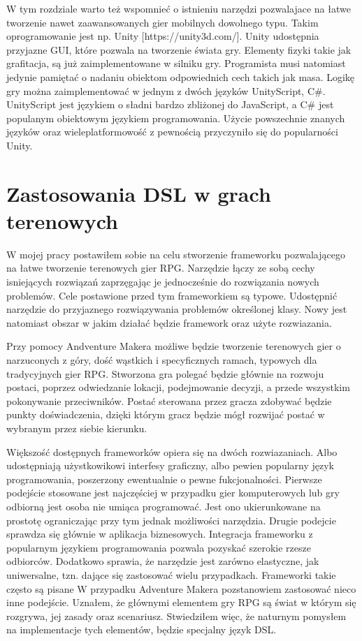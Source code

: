 \documentclass	{xmgr}
\begin{document}
W tym rozdziale warto też wspomnieć o istnieniu narzędzi pozwalajace na łatwe tworzenie nawet zaawansowanych gier mobilnych dowolnego typu. Takim oprogramowanie jest np. Unity [https://unity3d.com/]. Unity udostępnia przyjazne GUI, które pozwala na tworzenie świata gry. Elementy fizyki takie jak grafitacja, są już zaimplementowane w silniku gry. Programista musi natomiast jedynie pamiętać o nadaniu obiektom odpowiednich cech takich jak masa. Logikę gry można zaimplementować w jednym z dwóch języków UnityScript, C\#. UnityScript jest językiem o sładni bardzo zbliżonej do JavaScript, a C\# jest populanym obiektowym językiem programowania. Użycie powszechnie znanych języków oraz wieleplatformowość z pewnością przyczyniło się do popularności Unity.

\section{Zastosowania DSL w grach terenowych}

W mojej pracy postawiłem sobie na celu stworzenie frameworku pozwalającego na łatwe tworzenie terenowych gier RPG. Narzędzie łączy ze sobą cechy isniejących rozwiązań zaprzęgając je jednocześnie do rozwiązania nowych problemów. Cele postawione przed tym frameworkiem są typowe. Udostępnić narzędzie do przyjaznego rozwiązywania problemów określonej klasy. Nowy jest natomiast obszar w jakim działać będzie framework oraz użyte rozwiazania.

Przy pomocy Andventure Makera możliwe będzie tworzenie terenowych gier o narzuconych z góry, dość wąstkich i specyficznych ramach, typowych dla tradycyjnych gier RPG. Stworzona gra polegać będzie głównie na rozwoju postaci, poprzez odwiedzanie lokacji, podejmowanie decyzji, a przede wszystkim pokonywanie przeciwników. Postać sterowana przez gracza zdobywać będzie punkty doświadczenia, dzięki którym gracz będzie mógł rozwijać postać w wybranym przez siebie kierunku. 

Większość dostępnych frameworków opiera się na dwóch rozwiazaniach. Albo udostępniają użystkowikowi interfesy graficzny, albo pewien popularny język programowania, poszerzony ewentualnie o pewne fukcjonalności. Pierwsze podejście stosowane jest najczęściej w przypadku gier komputerowych lub gry odbiorną jest osoba nie umiąca programować. Jest ono ukierunkowane na prostotę ograniczając przy tym jednak możliwości narzędzia. Drugie podejcie sprawdza się głównie w aplikacja biznesowych. Integracja frameworku z popularnym językiem programowania pozwala pozyskać szerokie rzesze odbiorców. Dodatkowo sprawia, że narzędzie jest zarówno elastyczne, jak uniwersalne, tzn. dające się zastosować wielu przypadkach. Frameworki takie często są pisane   
W przypadku Adventure Makera pozstanowiem zastosować nieco inne podejście. Uznałem, że głównymi elementem gry RPG są świat w którym się rozgrywa, jej zasady oraz scenariusz. Stwiedziłem więc, że naturnym pomysłem na implementacje tych elementów, będzie specjalny język DSL. 
\end{document}
